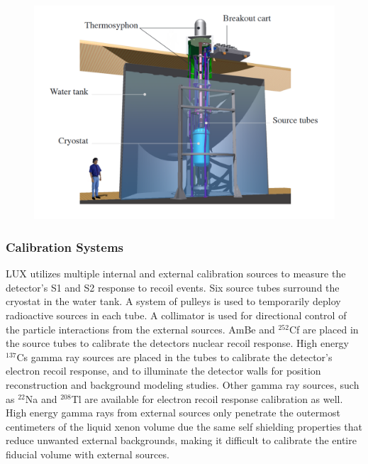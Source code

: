 \documentclass[a4paper,12pt]{article}
\begin{document}
 \begin{figure} [!h]
\includegraphics[scale=.35]{LuxWaterTank.png} 
\label{LuxWaterTank}
\end{figure}

\subsubsection{Calibration Systems}

LUX utilizes multiple internal and external calibration sources to measure the detector's S1 and S2 response to recoil events.  Six source tubes surround the cryostat in the water tank.  A system of pulleys is used to temporarily deploy radioactive sources in each tube.  A collimator is used for directional control of the particle interactions from the external sources. AmBe and $^{252}$Cf are placed in the source tubes to calibrate the detectors nuclear recoil response.  High energy $^{137}$Cs gamma ray sources are placed in the tubes to calibrate the detector's electron recoil response, and to illuminate the detector walls for position reconstruction and background modeling studies.  Other gamma ray sources, such as $^{22}$Na and $^{208}$Tl are available for electron recoil response calibration as well.  High energy gamma rays from external sources only penetrate the outermost centimeters of the liquid xenon volume due the same self shielding properties that reduce unwanted external backgrounds, making it difficult to calibrate the entire fiducial volume with external sources.
\end{document}
